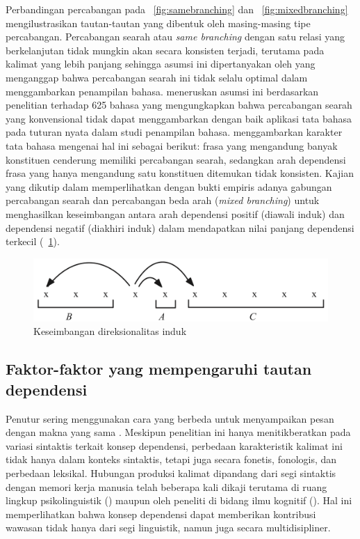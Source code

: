 Perbandingan percabangan pada \pic~\ref{fig:samebranching} dan \pic~\ref{fig:mixedbranching} mengilustrasikan tautan-tautan yang dibentuk oleh masing-masing tipe percabangan. Percabangan searah atau \textit{same branching} dengan satu relasi yang berkelanjutan tidak mungkin akan secara konsisten terjadi, terutama pada kalimat yang lebih panjang sehingga asumsi ini dipertanyakan oleh \cite{temperley2008dependency} yang menganggap bahwa percabangan searah ini tidak selalu optimal dalam menggambarkan penampilan bahasa. \cite{temperley2008dependency} meneruskan asumsi ini berdasarkan penelitian \cite{dryer1992greenbergian} terhadap 625 bahasa yang mengungkapkan bahwa percabangan searah yang konvensional tidak dapat menggambarkan dengan baik aplikasi tata bahasa pada tuturan nyata dalam studi penampilan bahasa. \cite{dryer1992greenbergian} menggambarkan karakter tata bahasa mengenai hal ini sebagai berikut: frasa yang mengandung banyak konstituen cenderung memiliki percabangan searah, sedangkan arah dependensi frasa yang hanya mengandung satu konstituen ditemukan tidak konsisten. Kajian \cite{dryer1992greenbergian} yang dikutip dalam \cite{gildea2010grammars} memperlihatkan dengan bukti empiris adanya gabungan percabangan searah dan percabangan beda arah (\textit{mixed branching}) untuk menghasilkan keseimbangan antara arah dependensi positif (diawali induk) dan dependensi negatif (diakhiri induk) dalam mendapatkan nilai panjang dependensi terkecil (\pic~\ref{fig:balancedbranching}).

\begin{figure}
	\centering \includegraphics[width=0.8
	\textwidth] {pics/balancedbranching.png} \caption{Keseimbangan direksionalitas induk} 
\label{fig:balancedbranching} \end{figure}

\subsection{Faktor-faktor yang mempengaruhi tautan dependensi}
Penutur sering menggunakan cara yang berbeda untuk menyampaikan pesan dengan makna yang sama \citep{kroch2001syntactic}. Meskipun penelitian ini hanya menitikberatkan pada variasi sintaktis terkait konsep dependensi, perbedaan karakteristik kalimat ini tidak hanya dalam konteks sintaktis, tetapi juga secara fonetis, fonologis, dan perbedaan leksikal. Hubungan produksi kalimat dipandang dari segi sintaktis dengan memori kerja manusia telah beberapa kali dikaji terutama di ruang lingkup psikolinguistik (\citealp{jay2003psychology, levy2013surprisal}) maupun oleh peneliti di bidang ilmu kognitif (\citealp{futrell2015large, christiansen2016now, liu2017dependency}). Hal ini memperlihatkan bahwa konsep dependensi dapat memberikan kontribusi wawasan tidak hanya dari segi linguistik, namun juga secara multidisipliner.

